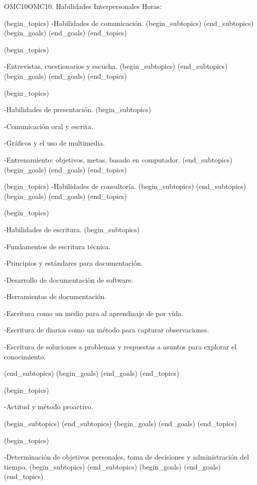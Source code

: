 \begin{BKL2}{OMC10}{OMC10. Habilidades Interpersonales}
Horas:
 
(begin_topics)
-Habilidades de comunicación.
(begin_subtopics)
(end_subtopics)
(begin_goals)
(end_goals)
(end_topics)

 

(begin_topics)

-Entrevistas, cuestionarios y escucha.
(begin_subtopics)
(end_subtopics)
(begin_goals)
(end_goals)
(end_topics)

 

(begin_topics)

-Habilidades de presentación.
(begin_subtopics)

-Comunicación oral y escrita.

-Gráficos y el uso de multimedia.

-Entrenamiento: objetivos, metas, basado en computador.
(end_subtopics)
(begin_goals)
(end_goals)
(end_topics)

 

(begin_topics)
-Habilidades de consultoría.
(begin_subtopics)
(end_subtopics)
(begin_goals)
(end_goals)
(end_topics)

 

(begin_topics)

-Habilidades de escritura.
(begin_subtopics)

-Fundamentos de escritura técnica.

-Principios y estándares para documentación.

-Desarrollo de documentación de software.

-Herramientas de documentación.

-Escritura como un medio para al aprendizaje de por vida.

-Escritura de diarios como un método para capturar observaciones.

-Escritura de soluciones a problemas y respuestas a asuntos para explorar el conocimiento.

(end_subtopics)
(begin_goals)
(end_goals)
(end_topics)

 

(begin_topics)

-Actitud y método proactivo.

(begin_subtopics)
(end_subtopics)
(begin_goals)
(end_goals)
(end_topics)

 

(begin_topics)

-Determinación de objetivos personales, toma de decisiones y administración del tiempo.
(begin_subtopics)
(end_subtopics)
(begin_goals)
(end_goals)
(end_topics)


\end{BKL2}
